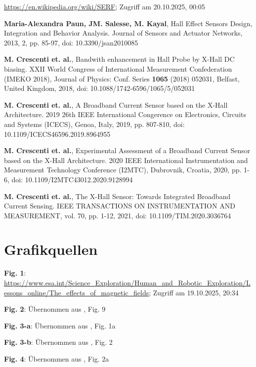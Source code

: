 \documentclass[12pt, a4paper]{article}
\begin{document}
\begin{thebibliography}{}
	\url{https://en.wikipedia.org/wiki/SERF}; Zugriff am 20.10.2025, 00:05 
	
	
	
	
	
	\textbf{Maria-Alexandra Paun, JM. Salesse, M. Kayal}, Hall Effect Sensors Design, Integration and Behavior Analysis. Journal of Sensors and Actuator Networks, 2013, 2, pp. 85-97, doi: 10.3390/jsan2010085
	
	\textbf{M. Crescenti et. al.}, Bandwith enhancement in Hall Probe by X-Hall DC biasing. XXII World Congress of International Measurement Confederation (IMEKO 2018), Journal of Physics: Conf. Series \textbf{1065} (2018) 052031, Belfast, United Kingdom, 2018, doi: 10.1088/1742-6596/1065/5/052031
	
	\textbf{M. Crescenti et. al.}, A  Broadband Current Sensor based on the X-Hall Architecture. 2019 26th IEEE International Congerence on Electronics, Circuits and Systems (ICECS), Genoa, Italy, 2019, pp. 807-810, doi: 10.1109/ICECS46596.2019.8964955
	
	\textbf{M. Crescenti et. al.}, Experimental Assessment of a Broadband Current Sensor based on the X-Hall Architecture. 2020 IEEE International Instrumentation and Measurement Technology Conference (I2MTC), Dubrovnik, Croatia, 2020, pp. 1-6, doi: 10.1109/I2MTC43012.2020.9128994
	
	\textbf{M. Crescenti et. al.}, The X-Hall Sensor: Towards Integrated Broadband Current Sensing. IEEE TRANSACTIONS ON INSTRUMENTATION AND MEASUREMENT, vol. 70, pp. 1-12, 2021, doi: 10.1109/TIM.2020.3036764
	
	
	
	
	
	
	
	
\end{thebibliography}

\section*{Grafikquellen}
\begin{description}
	\item \textbf{Fig. 1}: \url{https://www.esa.int/Science_Exploration/Human_and_Robotic_Exploration/Lessons_online/The_effects_of_magnetic_fields}; Zugriff am 19.10.2025, 20:34
	\item \textbf{Fig. 2}: Übernommen aus \cite{tarduno25}, Fig. 9
	\item \textbf{Fig. 3-a}: Übernommen aus \cite{cres18}, Fig. 1a
	\item \textbf{Fig. 3-b}: Übernommen aus \cite{cres20}, Fig. 2
	\item \textbf{Fig. 4}: Übernommen aus \cite{cres18}, Fig. 2a
	
\end{description}
\end{document}
